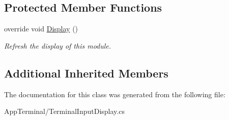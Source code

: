 \subsection*{Protected Member Functions}
\begin{DoxyCompactItemize}
\item 
\hypertarget{class_m_b_c_1_1_app_1_1_terminal_1_1_terminal_input_display_a3e331c373a858b1eedac0f063826af63}{override void \hyperlink{class_m_b_c_1_1_app_1_1_terminal_1_1_terminal_input_display_a3e331c373a858b1eedac0f063826af63}{Display} ()}\label{class_m_b_c_1_1_app_1_1_terminal_1_1_terminal_input_display_a3e331c373a858b1eedac0f063826af63}

\begin{DoxyCompactList}\small\item\em Refresh the display of this module.\end{DoxyCompactList}\end{DoxyCompactItemize}
\subsection*{Additional Inherited Members}


The documentation for this class was generated from the following file\-:\begin{DoxyCompactItemize}
\item 
App\-Terminal/Terminal\-Input\-Display.\-cs\end{DoxyCompactItemize}
